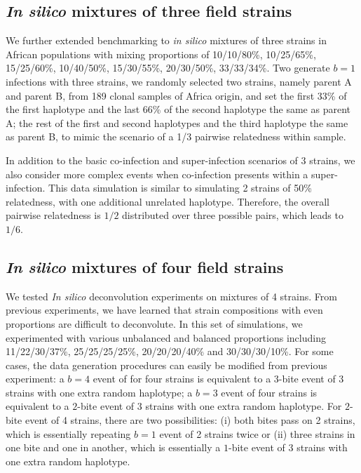 \documentclass[9pt]{article}
\begin{document}
\subsection{{\it In silico} mixtures of three field strains}
We further extended benchmarking to \emph{in silico} mixtures of three strains in African populations with mixing proportions of 10/10/80\%, 10/25/65\%, 15/25/60\%, 10/40/50\%, 15/30/55\%, 20/30/50\%, 33/33/34\%. Two generate $b=1$ infections with three strains, we randomly selected two strains, namely parent A and parent B, from 189 clonal samples of Africa origin, and set the first 33\% of the first haplotype and the last 66\% of the second haplotype the same as parent A; the rest of the first and second haplotypes and the third haplotype the same as parent B, to mimic the scenario of a 1/3 pairwise relatedness within sample.

In addition to the basic co-infection and super-infection scenarios of 3 strains, we also consider more complex events when co-infection presents within a super-infection. This data simulation is similar to simulating 2 strains of 50\% relatedness, with one additional unrelated haplotype. Therefore, the overall pairwise relatedness is $1/2$ distributed over three possible pairs, which leads to $1/6$.

\subsection{{\it In silico} mixtures of four field strains}
We tested {\it In silico} deconvolution experiments on mixtures of 4 strains. From previous experiments, we have learned that strain compositions with even proportions are difficult to deconvolute. In this set of simulations, we experimented with various unbalanced and balanced proportions including 11/22/30/37\%, 25/25/25/25\%, 20/20/20/40\% and 30/30/30/10\%. For some cases, the data generation procedures can easily be modified from previous experiment: a $b=4$ event of for four strains is equivalent to a $3$-bite event of 3 strains with one extra random haplotype; a $b=3$ event of four strains is equivalent to a $2$-bite event of 3 strains with one extra random haplotype. For $2$-bite event of 4 strains, there are two possibilities: (i) both bites pass on 2 strains, which is essentially repeating $b=1$ event of 2 strains twice or (ii) three strains in one bite and one in another, which is essentially a $1$-bite event of 3 strains with one extra random haplotype.


\end{document}
